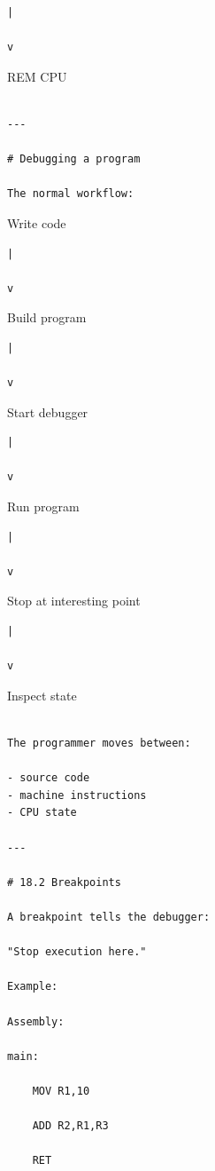 \documentclass[
  oneside,
  openany]{book}
\begin{document}
\begin{verbatim}
|

v
\end{verbatim}

REM CPU

\begin{verbatim}

---

# Debugging a program

The normal workflow:
\end{verbatim}

Write code

\begin{verbatim}
|

v
\end{verbatim}

Build program

\begin{verbatim}
|

v
\end{verbatim}

Start debugger

\begin{verbatim}
|

v
\end{verbatim}

Run program

\begin{verbatim}
|

v
\end{verbatim}

Stop at interesting point

\begin{verbatim}
|

v
\end{verbatim}

Inspect state

\begin{verbatim}

The programmer moves between:

- source code
- machine instructions
- CPU state

---

# 18.2 Breakpoints

A breakpoint tells the debugger:

"Stop execution here."

Example:

Assembly:

main:

    MOV R1,10

    ADD R2,R1,R3

    RET
\end{verbatim}
\end{document}
